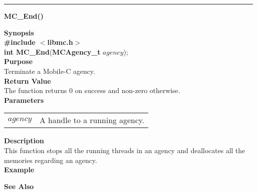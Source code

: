 \noindent
\vspace{5pt}
\rule{6.5in}{0.015in}
\noindent
{}
{\LARGE \bf MC\_End()}\\

\noindent
{\bf Synopsis}\\
{\bf \#include $<$libmc.h$>$}\\
{\bf int MC\_End}({\bf MCAgency\_t} $agency$);\\

\noindent
{\bf Purpose}\\
Terminate a Mobile-C agency.\\

\noindent
{\bf Return Value}\\
The function returns 0 on success and non-zero otherwise.\\

\noindent
{\bf Parameters}
\vspace{-0.1in}
\begin{description}
\item               
\begin{tabular}{p{10 mm}p{145 mm}}
$agency$ & A handle to a running agency.
\end{tabular}
\end{description}

\noindent
{\bf Description}\\
This function stops all the running threads in an agency and deallocates all 
the memories regarding an agency.\\

\noindent
{\bf Example}\\
\noindent
{\footnotesize}

\noindent
{\bf See Also}\\

